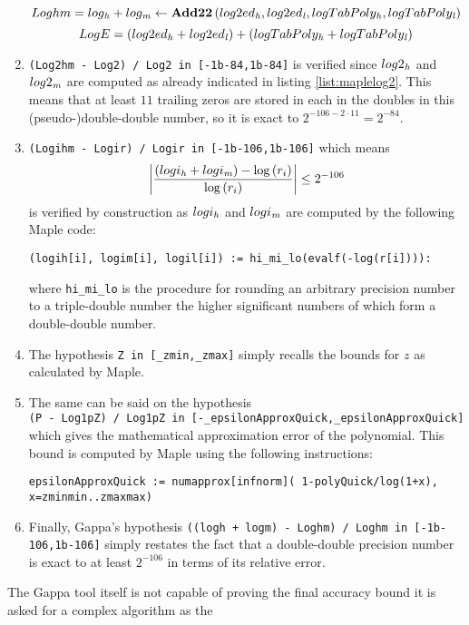 \begin{enumerate}
$$Loghm = log_{\mathit{h}} + log_{\mathit{m}} \gets \mathbf{Add22} \left( log2ed_{\mathit{h}}, log2ed_{\mathit{l}}, logTabPoly_{\mathit{h}}, logTabPoly_{\mathit{l}} \right)$$
$$LogE = \left( log2ed_{\mathit{h}} + log2ed_{\mathit{l}} \right) + \left( logTabPoly_{\mathit{h}} + logTabPoly_{\mathit{l}} \right)$$
\item {\tt (Log2hm - Log2) / Log2 in [-1b-84,1b-84]} is verified 
since $log2_{\mathit{h}}$ and $log2_{\mathit{m}}$ are computed as already indicated in listing \ref{list:maplelog2}.
This means that at least $11$ trailing zeros are stored in each in the doubles in this (pseudo-)double-double number, 
so it is exact to $2^{-106-2 \cdot 11} = 2^{-84}$.
\item {\tt (Logihm - Logir) / Logir in [-1b-106,1b-106]} which means
$$\left \vert \frac{\left( logi_{\mathit{h}} + logi_{\mathit{m}} \right) - \log\left( r_i \right)}{\log\left( r_i \right)} \right \vert \leq 2^{-106}$$
is verified by construction as $logi_{\mathit{h}}$ and $logi_{\mathit{m}}$ are computed by the following Maple code:
\begin{lstlisting}[caption={Maple code for computing $logi_\hi$ and $logi_\mi$},firstnumber=35]
(logih[i], logim[i], logil[i]) := hi_mi_lo(evalf(-log(r[i]))):
\end{lstlisting}
where {\tt hi\_mi\_lo} is the procedure for rounding an arbitrary precision number to a triple-double number the higher
significant numbers of which form a double-double number.
\item The hypothesis {\tt Z in [\_zmin,\_zmax]} simply recalls the bounds for $z$ as calculated by Maple.
\item The same can be said on the hypothesis \\
{\tt (P - Log1pZ) / Log1pZ in [-\_epsilonApproxQuick,\_epsilonApproxQuick]} \\
which gives the mathematical approximation error of the polynomial. This bound is computed by Maple using the following
instructions:
\begin{lstlisting}[caption={Maple code for computing the relative error of the polynomial},firstnumber=129]
epsilonApproxQuick := numapprox[infnorm]( 1-polyQuick/log(1+x), x=zminmin..zmaxmax)
\end{lstlisting}
\item Finally, Gappa's hypothesis {\tt ((logh + logm) - Loghm) / Loghm in [-1b-106,1b-106]} 
simply restates the fact that a double-double precision number is exact to 
at least $2^{-106}$ in terms of its relative error.
\end{enumerate}
The Gappa tool itself is not capable of proving the final accuracy bound it is asked for a complex algorithm as the 
